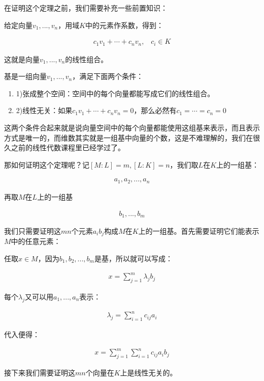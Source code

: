 \documentclass[12pt, a4paper, oneside]{ctexart}
\theoremstyle{definition}
\begin{document}
在证明这个定理之前，我们需要补充一些前置知识：

给定向量$v_1,...,v_n$，用域$K$中的元素作系数，得到：

\begin{align*}
c_1v_1+\cdots+c_nv_n,\;\;\; c_i\in K
\end{align*}

这就是向量$v_1,...,v_n$的线性组合。

基是一组向量$v_1,...,v_n$，满足下面两个条件：

\begin{enumerate}
\item 1)张成整个空间：空间中的每个向量都能写成它们的线性组合。
\item 2)线性无关：如果$c_1v_1+\cdots+c_nv_n=0$，那么必然有$c_1=\cdots=c_n=0$
\end{enumerate}

这两个条件合起来就是说向量空间中的每个向量都能使用这组基来表示，而且表示方式是唯一的，而维数其实就是一组基中向量的个数，这是不难理解的，我们在很久之前的线性代数课程里已经学过了。

那如何证明这个定理呢？记$[M:L]=m,[L:K]=n$，我们取$L$在$K$上的一组基：

\begin{align*}
a_1,a_2,...,a_n
\end{align*}

再取$M$在$L$上的一组基

\begin{align*}
b_1,...,b_m
\end{align*}

我们只需要证明这$mn$个元素$a_ib_j$构成$M$在$K$上的一组基。首先需要证明它们能表示$M$中的任意元素：

任取$x\in M$，因为$b_1,b_2,...,b_m$是基，所以就可以写成：

\begin{align*}
x=\sum_{j=1}^m\lambda_jb_j
\end{align*}

每个$\lambda_j$又可以用$a_1,...,a_n$表示：

\begin{align*}
\lambda_j=\sum_{i=1}^nc_{ij}a_i
\end{align*}

代入便得：

\begin{align*}
x=\sum_{j=1}^m\sum_{i=1}^nc_{ij}a_ib_j
\end{align*}

接下来我们需要证明这$mn$个向量在$K$上是线性无关的。
\end{document}
